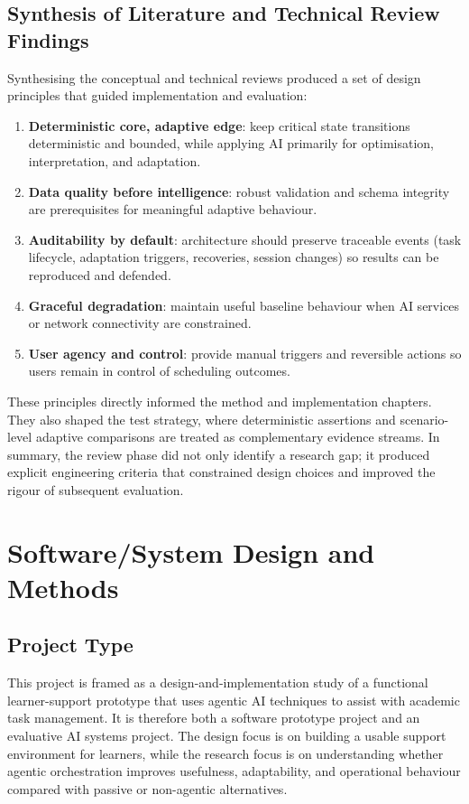 \documentclass[12pt]{article}
\begin{document}
\subsection{Synthesis of Literature and Technical Review Findings}
Synthesising the conceptual and technical reviews produced a set of design principles that guided implementation and evaluation:
\begin{enumerate}
    \item \textbf{Deterministic core, adaptive edge}: keep critical state transitions deterministic and bounded, while applying AI primarily for optimisation, interpretation, and adaptation.
    \item \textbf{Data quality before intelligence}: robust validation and schema integrity are prerequisites for meaningful adaptive behaviour.
    \item \textbf{Auditability by default}: architecture should preserve traceable events (task lifecycle, adaptation triggers, recoveries, session changes) so results can be reproduced and defended.
    \item \textbf{Graceful degradation}: maintain useful baseline behaviour when AI services or network connectivity are constrained.
    \item \textbf{User agency and control}: provide manual triggers and reversible actions so users remain in control of scheduling outcomes.
\end{enumerate}

These principles directly informed the method and implementation chapters. They also shaped the test strategy, where deterministic assertions and scenario-level adaptive comparisons are treated as complementary evidence streams. In summary, the review phase did not only identify a research gap; it produced explicit engineering criteria that constrained design choices and improved the rigour of subsequent evaluation.

\section{Software/System Design and Methods}
\subsection{Project Type}
This project is framed as a design-and-implementation study of a functional learner-support prototype that uses agentic AI techniques to assist with academic task management. It is therefore both a software prototype project and an evaluative AI systems project. The design focus is on building a usable support environment for learners, while the research focus is on understanding whether agentic orchestration improves usefulness, adaptability, and operational behaviour compared with passive or non-agentic alternatives.
\end{document}
